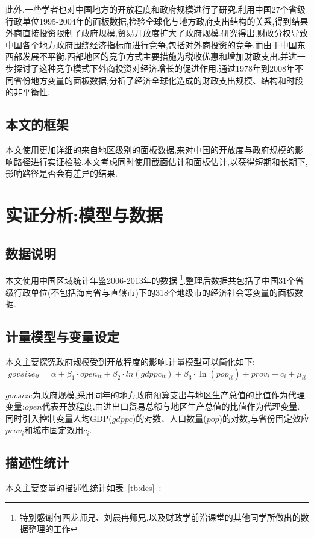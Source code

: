 \documentclass[10pt]{article}
\begin{document}
    此外,一些学者也对中国地方的开放程度和政府规模进行了研究.\cite{cai2008}利用中国27个省级行政单位1995-2004年的面板数据,检验全球化与地方政府支出结构的关系,得到结果外商直接投资限制了政府规模,贸易开放度扩大了政府规模.\cite{wang2007}研究得出,财政分权导致中国各个地方政府围绕经济指标而进行竞争,包括对外商投资的竞争.而由于中国东西部发展不平衡,西部地区的竞争方式主要措施为税收优惠和增加财政支出.并进一步探讨了这种竞争模式下外商投资对经济增长的促进作用.\cite{sheng2010}通过1978年到2008年不同省份地方变量的面板数据,分析了经济全球化造成的财政支出规模、结构和时段的非平衡性.
    \subsection{本文的框架}
    本文使用更加详细的来自地区级别的面板数据,来对中国的开放度与政府规模的影响路径进行实证检验.本文考虑同时使用截面估计和面板估计,以获得短期和长期下,影响路径是否会有差异的结果.

\section{实证分析:模型与数据}
    \subsection{数据说明}
    本文使用中国区域统计年鉴2006-2013年的数据
    \footnote{特别感谢何西龙师兄、刘晨冉师兄,以及财政学前沿课堂的其他同学所做出的数据整理的工作}.整理后数据共包括了中国31个省级行政单位(不包括海南省与直辖市)下的318个地级市的经济社会等变量的面板数据.
    \subsection{计量模型与变量设定}
    本文主要探究政府规模受到开放程度的影响.计量模型可以简化如下:
    \begin{equation}
     govsize_{it} = \alpha + \beta_1 \cdot open_{it} + \beta_2 \cdot ln(gdppc_{it}) + \beta_3 \cdot \ln(pop_{it}) + prov_{i} +c_i + \mu_{it}
     \end{equation}


$govsize$为政府规模,采用同年的地方政府预算支出与地区生产总值的比值作为代理变量;$open$代表开放程度,由进出口贸易总额与地区生产总值的比值作为代理变量.
同时引入控制变量人均GDP($gdppc$)的对数、人口数量($pop$)的对数,与省份固定效应$prov_i$和城市固定效用$c_i$.

\subsection{描述性统计}
本文主要变量的描述性统计如表~\ref{tb:des}~:
\end{document}
